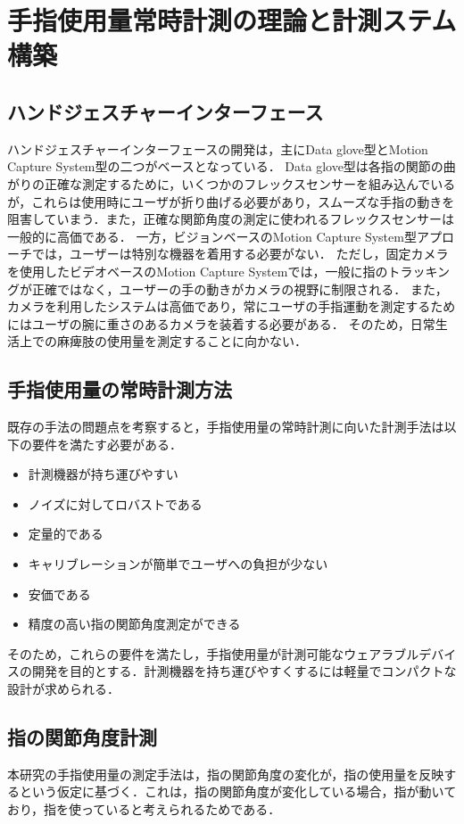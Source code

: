 \chapter{手指使用量常時計測の理論と計測ステム構築}

\section{ハンドジェスチャーインターフェース}
ハンドジェスチャーインターフェースの開発は，主にData glove型とMotion Capture System型の二つがベースとなっている．
Data glove型は各指の関節の曲がりの正確な測定するために，いくつかのフレックスセンサーを組み込んでいるが，これらは使用時にユーザが折り曲げる必要があり，スムーズな手指の動きを阻害していまう．また，正確な関節角度の測定に使われるフレックスセンサーは一般的に高価である．
一方，ビジョンベースのMotion Capture System型アプローチでは，ユーザーは特別な機器を着用する必要がない．
ただし，固定カメラを使用したビデオベースのMotion Capture Systemでは，一般に指のトラッキングが正確ではなく，ユーザーの手の動きがカメラの視野に制限される．
また，カメラを利用したシステムは高価であり，常にユーザの手指運動を測定するためにはユーザの腕に重さのあるカメラを装着する必要がある．
そのため，日常生活上での麻痺肢の使用量を測定することに向かない．

\section{手指使用量の常時計測方法}
既存の手法の問題点を考察すると，手指使用量の常時計測に向いた計測手法は以下の要件を満たす必要がある．

\begin{itemize}
 \item 計測機器が持ち運びやすい
 \item ノイズに対してロバストである
 \item 定量的である
 \item キャリブレーションが簡単でユーザへの負担が少ない
 \item 安価である
 \item 精度の高い指の関節角度測定ができる
\end{itemize}

そのため，これらの要件を満たし，手指使用量が計測可能なウェアラブルデバイスの開発を目的とする．計測機器を持ち運びやすくするには軽量でコンパクトな設計が求められる．

\section{指の関節角度計測}
本研究の手指使用量の測定手法は，指の関節角度の変化が，指の使用量を反映するという仮定に基づく．これは，指の関節角度が変化している場合，指が動いており，指を使っていると考えられるためである．

